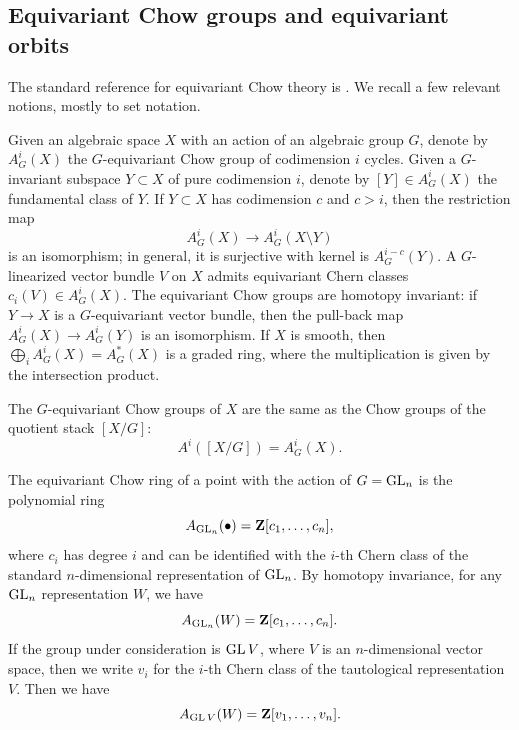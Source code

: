 \documentclass[12pt,reqno]{amsart}
\renewcommand{\to}{{\longrightarrow}}
\numberwithin{equation}{section}
\begin{document}
\subsection{Equivariant Chow groups and equivariant orbits}
The standard reference for equivariant Chow theory is \cite{edi.gra:98}.
We recall a few relevant notions, mostly to set notation.

Given an algebraic space $X$ with an action of an algebraic group $G$,
denote by $A^i_G(X)$ the $G$-equivariant Chow group of codimension $i$
cycles.  Given a $G$-invariant subspace $Y \subset X$ of pure
codimension $i$, denote by $[Y] \in A^i_G(X)$ the fundamental class of
$Y$.  If $Y \subset X$ has codimension $c$ and $c > i$, then the restriction map
\[ A^i_G(X) \to A^i_G(X \setminus Y)\]
is an isomorphism; in general, it is surjective with kernel is $A^{i-c}_G(Y)$.
A $G$-linearized vector bundle
$V$ on $X$ admits equivariant Chern classes $c_i(V) \in A^i_G(X)$.
The equivariant Chow groups are homotopy invariant: if $Y \to X$ is a
$G$-equivariant vector bundle, then the pull-back map
$A^i_G(X) \to A^i_G(Y)$ is an isomorphism.  If $X$ is smooth, then
$\bigoplus_i A^i_G(X) = A^*_G(X)$ is a graded ring, where the multiplication is given by the
intersection product.

The $G$-equivariant Chow groups of $X$ are the same as the Chow groups
of the quotient stack $[X/G]$:
\[ A^i\left( [X/G] \right) = A^i_G(X).\]

The equivariant Chow ring of a point with the action of $G = \operatorname{GL}_n$ is
the polynomial ring
\[ A_{\operatorname{GL}_n}(\bullet) = {\bf Z}[c_1,\dots, c_n],\] where $c_i$ has
degree $i$ and can be identified with the $i$-th Chern class of the
standard $n$-dimensional representation of $\operatorname{GL}_n$.  By homotopy
invariance, for any $\operatorname{GL}_n$ representation $W$, we have
\[ A_{\operatorname{GL}_n}(W) = {\bf Z}[c_1,\dots,c_n].\]
If the group under consideration is $\operatorname{GL} V$, where $V$ is an $n$-dimensional vector space,
then we write $v_i$ for the $i$-th Chern class of the tautological
representation $V$.  Then we have
\[ A_{\operatorname{GL} V}(W) = {\bf Z}[v_1,\dots,v_n].\]
\end{document}
